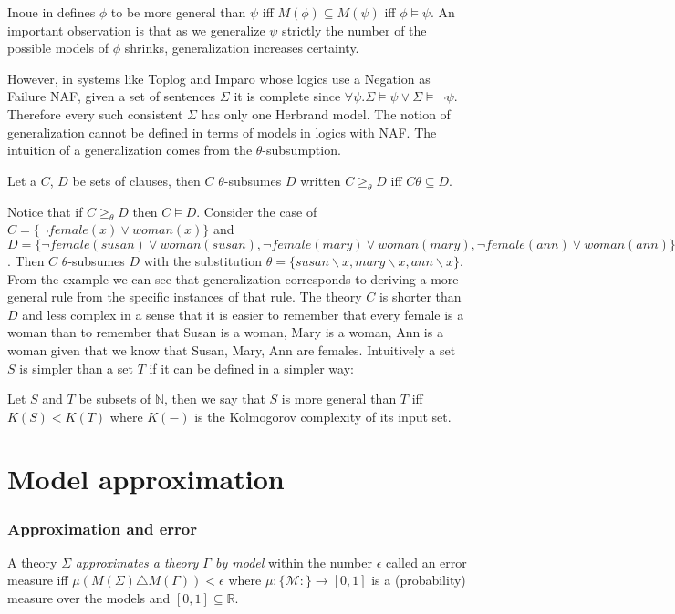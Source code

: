 Inoue in \cite{inoue2012} defines $\phi$ to be more general than $\psi$ iff
$M(\phi) \subseteq M(\psi)$ iff $\phi \models \psi$. An important observation is that as we generalize $\psi$ strictly the number of the possible models of $\phi$ shrinks, generalization increases certainty.

However, in systems like Toplog and Imparo whose logics use a Negation as Failure NAF, given a set of sentences $\Sigma$ it is complete since
$\forall \psi. \Sigma \models \psi \vee \Sigma \models \neg\psi$. Therefore every such consistent $\Sigma$ has only one Herbrand model. The notion of generalization cannot be defined in terms of models in logics with NAF. The intuition of a generalization comes from the $\theta$-subsumption.

\begin{defn}
Let a $C$, $D$ be sets of clauses, then $C$ $\theta$-subsumes $D$  written
$C \ge_\theta D$ iff $C \theta \subseteq D$.
\end{defn}

Notice that if $C \ge_\theta D$ then $C \models D$. Consider the case of $C=\{\neg female(x) \vee woman(x)\}$ and
$D=\{
\neg female(susan) \vee woman(susan),
\neg female(mary) \vee woman(mary),
\neg female(ann) \vee woman(ann) \}$.
Then $C$ $\theta$-subsumes $D$ with the substitution
$\theta=\{susan \backslash x, mary \backslash x, ann \backslash x\}$.
From the example we can see that generalization corresponds to deriving a more general rule from the specific instances of that rule. The theory $C$ is shorter than $D$ and less complex in a sense that it is easier to remember that every female is a woman than to remember that Susan is a woman, Mary is a woman, Ann is a woman given that we know that Susan, Mary, Ann are females.
Intuitively a set $S$ is simpler than a set $T$ if it can be defined in a simpler way:

\begin{defn}
Let $S$ and $T$ be subsets of $\mathbb{N}$, then we say that $S$ is more general than $T$ iff $K(S)<K(T)$ where $K(-)$ is the Kolmogorov complexity of its input set.
\end{defn}

\chapter{Model approximation}

\subsection{Approximation and error}
\begin{defn}
A theory $\Sigma$ \emph{approximates a theory $\Gamma$ by model} within the number $\epsilon$ called an error measure iff $\mu(M(\Sigma) \triangle M(\Gamma)) < \epsilon$ where $\mu:\{\mathcal{M}:\}\to [0,1]$ is a (probability) measure over the models and $[0,1] \subseteq \mathbb{R}$.
\end{defn}


